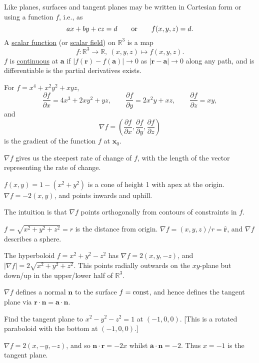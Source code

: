 \documentclass[10pt,notitlepage]{revtex4-1}
\newenvironment{example}[1][Example]{\begin{trivlist}
\item[\hskip \labelsep {\bfseries #1}]}{\end{trivlist}}
\newcommand{\dy}{\partial}
\newcommand{\ddy}[2]{\frac{\dy#1}{\dy#2}}
\newcommand{\grad}{\nabla}
\newcommand{\xb}{\boldsymbol{x}}
\newcommand{\ab}{{\boldsymbol{a}}}
\newcommand{\nb}{{\boldsymbol{n}}}
\begin{document}
Like planes, surfaces and tangent planes may be written in Cartesian form or
using a function $f$, i.e., as
\begin{equation}
	ax+by+cz=d\qquad\textnormal{or}\qquad f(x,y,z)=d.
\end{equation}
A \underline{scalar function} (or \underline{scalar field}) on $\mathbb{R}^3$ is
a map
\begin{equation}
	f:\mathbb{R}^3\rightarrow\mathbb{R},\ (x,y,z)\mapsto f(x,y,z).
\end{equation}
$f$ is \underline{continuous} at $\ab$ if
$|f(\boldsymbol{r})-f(\ab)|\rightarrow0$ as $|\boldsymbol{r}-\ab|\rightarrow0$
along any path, and is differentiable is the partial derivatives exists.
\begin{example}
	For $f=x^4+x^2y^2+xyz$,
	\begin{equation}
		\ddy{f}{x}=4x^3+2xy^2+yz,\qquad \ddy{f}{y}=2x^2y+xz,\qquad
		\ddy{f}{z}=xy,
	\end{equation}
	and
	\begin{equation}
		\grad f=\left(\ddy{f}{x},\ddy{f}{y},\ddy{f}{z}\right)
	\end{equation}
	is the gradient of the function $f$ at $\xb_0$.
\end{example}
$\grad f$ gives us the steepest rate of change of $f$, with the length of the
vector representing the rate of change.
\begin{example}
	$f(x,y)=1-(x^2+y^2)$ is a cone of height 1 with apex at the origin. $\grad
	f=-2(x,y)$, and points inwards and uphill.
\end{example}
The intuition is that $\grad f$ points orthogonally from contours of constraints
in $f$.
\begin{example}
	$f=\sqrt{x^2+y^2+z^2}=r$ is the distance from origin. $\grad
	f=(x,y,z)/r=\hat{\boldsymbol{r}}$, and $\grad f$ describes a sphere.
\end{example}
\begin{example}
	The hyperboloid $f=x^2+y^2-z^2$ has $\grad f=2(x,y,-z)$, and $|\grad
	f|=2\sqrt{x^2+y^2+z^2}$. This points radially outwards on the $xy$-plane but
	down/up in the upper/lower half of $\mathbb{R}^3$.
\end{example}
$\grad f$ defines a normal $\nb$ to the surface $f=\textnormal{const}$, and
hence defines the tangent plane via $\boldsymbol{r}\cdot\nb=\ab\cdot\nb$.
\begin{example}
	Find the tangent plane to $x^2-y^2-z^2=1$ at $(-1,0,0)$. [This is a rotated
	paraboloid with the bottom at $(-1,0,0)$.]
	
	$\grad f=2(x,-y,-z)$, and so $\nb\cdot\boldsymbol{r}=-2x$ whilst
	$\ab\cdot\nb=-2$. Thus $x=-1$ is the tangent plane.
\end{example}
\end{document}
